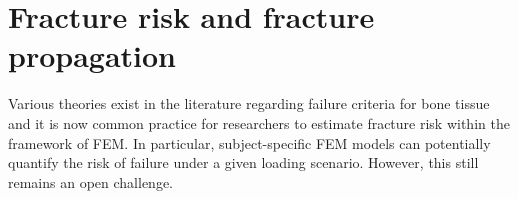 \documentclass[review]{elsarticle}
\numberwithin{equation}{section}
\begin{document}
%
%		
%


\section{Fracture risk and fracture propagation}\label{sec:release_energy}
Various theories exist in the literature regarding failure criteria for bone tissue and it is now common practice for researchers to estimate fracture risk within the framework of FEM. In particular, subject-specific FEM models can potentially quantify the risk of failure under a given loading scenario. However, this still remains an open challenge.
\end{document}
